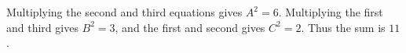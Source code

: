Multiplying the second and third equations gives $A^2=6$. Multiplying the first and third gives $B^2=3$, and the first and second gives $C^2=2$. Thus the sum is $\boxed{11}$.
